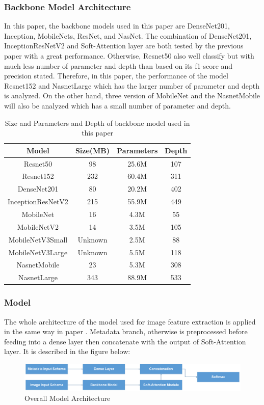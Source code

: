 \documentclass[sensors,article,submit,pdftex,moreauthors]{Definitions/mdpi}
\begin{document}
\subsubsection{Backbone Model Architecture}
In this paper, the backbone models used in this paper are DenseNet201\cite{06993}, Inception\cite{00567}, MobileNets\cite{04861}\cite{04381}\cite{02244}, ResNet\cite{03385}\cite{05027}, and NasNet\cite{07012}. The combination of DenseNet201, InceptionResNetV2 and Soft-Attention layer are both tested by the previous paper\cite{03358} with a great performance. Otherwise, Resnet50 also well classify but with much less number of parameter and depth than based on its f1-score and precision stated. Therefore, in this paper, the performance of the model Resnet152 and NasnetLarge which has the larger number of parameter and depth is analyzed. On the other hand, three version of MobileNet and the NasnetMobile will also be analyzed which has a small number of parameter and depth.  
\FloatBarrier
\begin{table}[ht]
	\centering
	\begin{tabular}{|c | c c c|} 
		\hline
		Model & Size(MB) & Parameters & Depth \\ 
		\hline
		Resnet50 & 98 & 25.6M & 107 \\ 
		\hline
		Resnet152 & 232 & 60.4M & 311 \\ 
		\hline
		DenseNet201 & 80 & 20.2M & 402 \\
		\hline
		InceptionResNetV2 & 215 & 55.9M & 449 \\
		\hline
		MobileNet & 16 & 4.3M & 55 \\ 
		\hline
		MobileNetV2 & 14 & 3.5M & 105 \\ 
		\hline
		MobileNetV3Small & Unknown & 2.5M & 88 \\ 
		\hline
		MobileNetV3Large & Unknown & 5.5M & 118 \\
		\hline
		NasnetMobile & 23 & 5.3M & 308 \\
		\hline
		NasnetLarge & 343 & 88.9M & 533 \\ 
		\hline
	\end{tabular}
	\caption{Size and Parameters and Depth of backbone model used in this paper}
	\label{table:2}
\end{table}
\FloatBarrier

\subsubsection{Model}
The whole architecture of the model used for image feature extraction is applied in the same way in paper \cite{03358}. Metadata branch, otherwise is preprocessed before feeding into a dense layer then concatenate with the output of Soft-Attention layer. It is described in the figure below:
\begin{figure}[h]
	\centering
	\includegraphics[width=1\linewidth]{Definitions/MainModel}
	\caption{Overall Model Architecture}
	\label{fig:mainmodel}
\end{figure}
\end{document}
